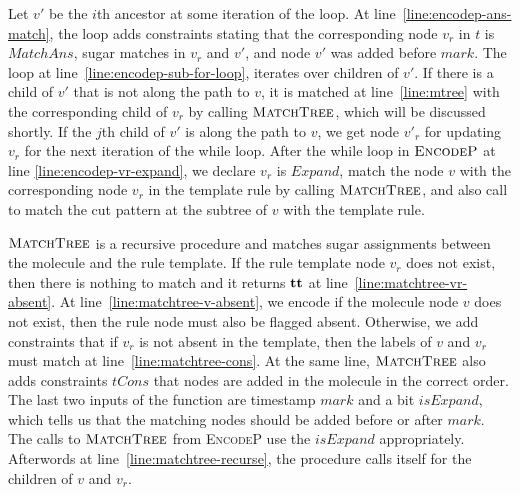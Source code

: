 Let $v'$ be the $i$th ancestor at some iteration of the loop.
At line~\ref{line:encodep-ans-match}, the loop adds constraints stating that
the corresponding node $v_r$ in $t$ is
$MatchAns$, sugar matches in $v_r$ and $v'$, and
node $v'$ was added before $mark$.
The loop at line~\ref{line:encodep-sub-for-loop}, iterates over
children of $v'$.
If there is a child of $v'$ that is not along the path to
$v$, it is matched at line~\ref{line:mtree} with the corresponding
child of $v_r$ by calling $\textsc{MatchTree}$, which
will be discussed shortly.
If the $j$th child of $v'$ is along the path to $v$,
we get node $v'_r$ for updating
$v_r$ for the next iteration of the while loop.
After the while loop in $\textsc{EncodeP}$ at line \ref{line:encodep-vr-expand}, we declare $v_r$
is $Expand$,  match the node $v$
with the corresponding node $v_r$ in the template rule by calling
$\textsc{MatchTree}$, and also call to match the cut pattern at
the subtree of $v$ with the template rule.



$\textsc{MatchTree}$ is a recursive procedure and matches
sugar assignments between the molecule and the rule template.
If the rule template node $v_r$ does not exist, then
there is nothing to match and it returns $\mathbf{tt}$ at
line~\ref{line:matchtree-vr-absent}.
At line~\ref{line:matchtree-v-absent}, we encode if the molecule node $v$ does not exist, then the rule node must also
be flagged absent. %
Otherwise, we add constraints
that if $v_r$ is not absent in the template, then
the labels of $v$ and $v_r$ must match at line~\ref{line:matchtree-cons}.
At the same line, $\textsc{MatchTree}$ also adds constraints $tCons$ that
nodes are added in the molecule in the correct order.
The last two inputs of the function are timestamp $mark$ and a bit $isExpand$,
which tells us that the matching nodes should be added before or after $mark$.
The calls to $\textsc{MatchTree}$ from \textsc{EncodeP} use the
$isExpand$ appropriately.
Afterwords at line~\ref{line:matchtree-recurse},
the procedure calls itself for the children of $v$ and $v_r$.

